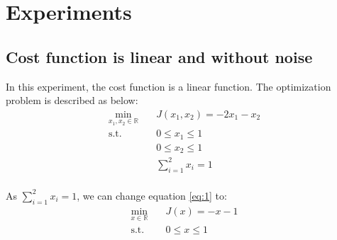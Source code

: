 \documentclass[a4paper,12pt]{article}
\begin{document}


\section{Experiments}
\subsection{Cost function is linear and without noise}
In this experiment, the cost function is a linear function. The optimization problem is described as below:\\


\begin{equation}\label{eq:1}
\begin{aligned}
\min_{x_1,x_2\in \mathbb{R}} \quad & J(x_1,x_2) = -2x_1-x_2\\
\textrm{s.t.} \quad & 0 \leq x_1 \leq 1\\
              \quad & 0 \leq x_2 \leq 1\\
              \quad & \sum_{i=1}^{2} x_i = 1\\
\end{aligned}
\end{equation}


As $\sum_{i=1}^{2} x_i = 1$, we can change equation \ref{eq:1} to:\\
\begin{equation}\label{eq:2}
\begin{aligned}
\min_{x\in \mathbb{R}} \quad & J(x) = -x-1\\
\textrm{s.t.} \quad & 0 \leq x \leq 1\\
\end{aligned}
\end{equation}
\end{document}
